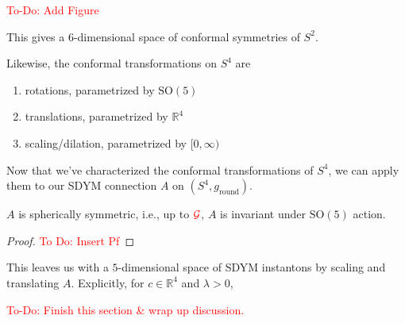 \documentclass[main]{subfiles}
\begin{document}
\textcolor{red}{To-Do: Add Figure}

This gives a $6$-dimensional space of conformal symmetries of $S^2$.

Likewise, the conformal transformations on $S^4$ are
\begin{enumerate}
\item rotations, parametrized by $\mathrm{SO}(5)$
\item translations, parametrized by $\mathbb{R}^4$
\item scaling/dilation, parametrized by $[0,\infty)$
\end{enumerate}

Now that we've characterized the conformal transformations of $S^4$, we can apply them to our SDYM connection $A$ on $(S^4,g_{\mathrm{round}})$.

\begin{proposition}
$A$ is spherically symmetric, i.e., up to $\textcolor{red}{\mathcal{G}}$, $A$ is invariant under $\mathrm{SO}(5)$ action.
\end{proposition}

\begin{proof}
\textcolor{red}{To Do: Insert Pf}
\end{proof}

This leaves us with a $5$-dimensional space of SDYM instantons by scaling and translating $A$. Explicitly, for $c\in\mathbb{R}^4$ and $\lambda>0$,

\textcolor{red}{To-Do: Finish this section \& wrap up discussion.}
\end{document}
